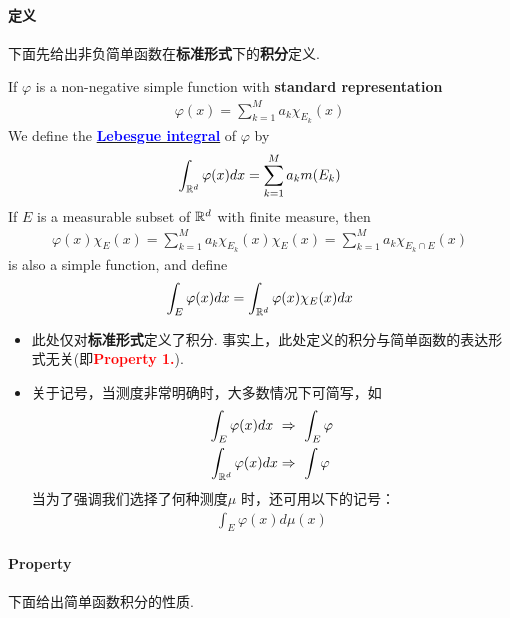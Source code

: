 \paragraph{定义}
	下面先给出非负简单函数在\textbf{标准形式}下的\textbf{积分}定义.
	\begin{defn}\label{def 3.1.1}
		If $\varphi$ is a non-negative simple function with \textbf{standard representation}
		\begin{align}
			\varphi(x) = \sum_{k = 1}^{M}{a_k \chi_{E_k}(x)}
		\end{align}
		We define the \underline{\textcolor{blue}{\textbf{Lebesgue integral}}} of $\varphi$ by
		\begin{align}
			\int_{\mathbb{R}^d}{\varphi(x) dx} = \sum_{k = 1}^{M}{a_k m(E_k)}
		\end{align}
		If $E$ is a measurable subset of $\mathbb{R}^d$ with finite measure, then
		\begin{align}
			\varphi(x) \chi_{E}(x) = \sum_{k = 1}^{M}{a_k \chi_{E_k}(x) \chi_{E}(x)} = \sum_{k = 1}^{M}{a_k \chi_{E_k \cap E}(x)}
		\end{align}
		is also a simple function, and define
		\begin{align}
			\int_{E}{\varphi(x) dx} = \int_{\mathbb{R}^d}{\varphi(x) \chi_{E}(x) dx}
		\end{align}
		
		\newpage
		\begin{rmk}
			\begin{itemize}
				\item 此处仅对\textbf{标准形式}定义了积分. 事实上，此处定义的积分与简单函数的表达形式无关(即\textcolor{red}{\textbf{Property 1.}}).
				
				\item 关于记号，当测度非常明确时，大多数情况下可简写，如
				\begin{align}
					\int_{E}{\varphi(x) dx} \,\, &\Rightarrow \,\, \int_{E}{\varphi} \\
					\int_{\mathbb{R}^d}{\varphi(x) dx} &\Rightarrow \,\, \int{\varphi}
				\end{align}
				当为了强调我们选择了何种测度$\mu$ 时，还可用以下的记号：
				\begin{align}
					\int_{E}{\varphi(x) d\mu(x)}
				\end{align}
			\end{itemize}
		\end{rmk}
	\end{defn}

\vspace{2em}
\paragraph{Property}
	下面给出简单函数积分的性质.
	
